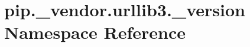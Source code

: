 \hypertarget{namespacepip_1_1__vendor_1_1urllib3_1_1__version}{}\section{pip.\+\_\+vendor.\+urllib3.\+\_\+version Namespace Reference}
\label{namespacepip_1_1__vendor_1_1urllib3_1_1__version}
